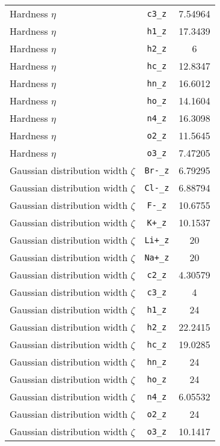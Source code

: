 \begin{table}[ht]
\begin{tabular}{lcc}
Hardness $\eta$ & \verb^c3_z^ & 7.54964 \\ 
Hardness $\eta$ & \verb^h1_z^ & 17.3439 \\ 
Hardness $\eta$ & \verb^h2_z^ & 6 \\ 
Hardness $\eta$ & \verb^hc_z^ & 12.8347 \\ 
Hardness $\eta$ & \verb^hn_z^ & 16.6012 \\ 
Hardness $\eta$ & \verb^ho_z^ & 14.1604 \\ 
Hardness $\eta$ & \verb^n4_z^ & 16.3098 \\ 
Hardness $\eta$ & \verb^o2_z^ & 11.5645 \\ 
Hardness $\eta$ & \verb^o3_z^ & 7.47205 \\ 
Gaussian distribution width $\zeta$ & \verb^Br-_z^ & 6.79295 \\ 
Gaussian distribution width $\zeta$ & \verb^Cl-_z^ & 6.88794 \\ 
Gaussian distribution width $\zeta$ & \verb^F-_z^ & 10.6755 \\ 
Gaussian distribution width $\zeta$ & \verb^K+_z^ & 10.1537 \\ 
Gaussian distribution width $\zeta$ & \verb^Li+_z^ & 20 \\ 
Gaussian distribution width $\zeta$ & \verb^Na+_z^ & 20 \\ 
Gaussian distribution width $\zeta$ & \verb^c2_z^ & 4.30579 \\ 
Gaussian distribution width $\zeta$ & \verb^c3_z^ & 4 \\ 
Gaussian distribution width $\zeta$ & \verb^h1_z^ & 24 \\ 
Gaussian distribution width $\zeta$ & \verb^h2_z^ & 22.2415 \\ 
Gaussian distribution width $\zeta$ & \verb^hc_z^ & 19.0285 \\ 
Gaussian distribution width $\zeta$ & \verb^hn_z^ & 24 \\ 
Gaussian distribution width $\zeta$ & \verb^ho_z^ & 24 \\ 
Gaussian distribution width $\zeta$ & \verb^n4_z^ & 6.05532 \\ 
Gaussian distribution width $\zeta$ & \verb^o2_z^ & 24 \\ 
Gaussian distribution width $\zeta$ & \verb^o3_z^ & 10.1417 \\ 
\hline
\end{tabular}
\end{table}
